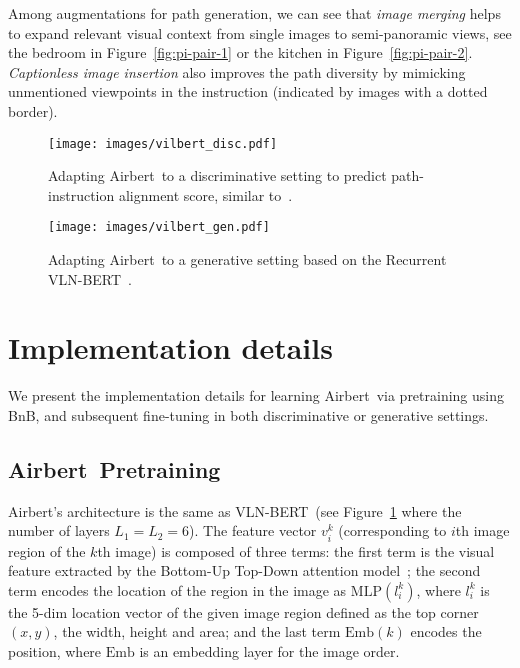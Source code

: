 \RequirePackage[dvipsnames,table]{xcolor} \documentclass[10pt,twocolumn,letterpaper]{article}
\newcommand{\vlnbert}{VLN-BERT}
\newcommand{\airbert}{Airbert}
\newcommand{\airbnb}{BnB}
\begin{document}
Among augmentations for path generation, we can see that \emph{image merging} helps to expand relevant visual context from single images to semi-panoramic views, see the bedroom in Figure~\ref{fig:pi-pair-1} or the kitchen in Figure~\ref{fig:pi-pair-2}.
\emph{Captionless image insertion} also improves the path diversity by mimicking unmentioned viewpoints in the instruction (indicated by images with a dotted border).

\begin{figure*}[t]
     \centering
     \begin{subfigure}{0.9\textwidth}
         \centering
         \texttt{[image: images/vilbert\_disc.pdf]}
         \caption{Adapting \airbert~to a discriminative setting to predict path-instruction alignment score, similar to~\cite{majumdar2020vlnbert}.}
         \label{fig:vilbert_disc_model}
     \end{subfigure}
     \hfill
     \begin{subfigure}{0.88\textwidth}
         \centering
         \texttt{[image: images/vilbert\_gen.pdf]}
         \caption{Adapting \airbert~to a generative setting based on the Recurrent VLN-BERT~\cite{hong2021recurrentvln}.}
         \label{fig:vilbert_gen_model}
     \end{subfigure}
    \caption{The adapted \airbert~model in both discriminative and generative settings for downstream VLN tasks.}
    \label{fig:models}
\end{figure*}


\section{Implementation details}
\label{sec:supp-details}

We present the implementation details for learning \airbert~via pretraining using \airbnb, and subsequent fine-tuning in both discriminative or generative settings.

\subsection{\airbert~Pretraining}
\airbert's architecture is the same as \vlnbert~(see Figure~\ref{fig:vilbert_disc_model} where the number of layers $L_1 = L_2 = 6$).
The feature vector $v^k_i$  (corresponding to $i$th image region of the $k$th image) is composed of three terms: the first term is the visual feature extracted by the Bottom-Up Top-Down attention model~\cite{anderson2017butd};
the second term encodes the location of the region in the image as $\text{MLP}(l^k_i)$, where $l^k_i$ is the 5-dim location vector of the given image region defined as the top corner $(x, y)$, the width, height and area;
and the last term $\text{Emb}(k)$ encodes the position, where $\text{Emb}$ is an embedding layer for the image order.
\end{document}
